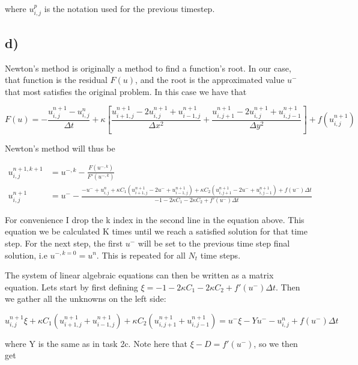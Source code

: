 \documentclass[norsk,a4paper,12pt]{scrartcl}
\begin{document}
where $u_{i, j}^p$ is the notation used for the previous timestep.

\subsection{d)}
Newton's method is originally a method to find a function's root. In our case, that function is the residual $F(u)$, and the root is the approximated value $u^-$ that most satisfies the original problem. In this case we have that 

\begin{equation}
    F(u) = -\frac{u_{i,j}^{n+1}-u_{i,j}^n}{\Delta t}+ \kappa \left[ \frac{ u_{i+1,j}^{n+1} -2u_{i,j}^{n+1} + u_{i-1,j}^{n+1}}{\Delta x^2} + \frac{ u_{i,j+1}^{n+1} -2u_{i,j}^{n+1} + u_{i,j-1}^{n+1} }{\Delta y^2} \right] + f(u_{i,j}^{n+1})
\end{equation}

Newton's method will thus be 

\begin{equation*}
\begin{aligned}
    u^{n+1, k+1}_{i,j} &= u^{-, k} - \frac{F(u^{-,k})}{F'(u^{-,k})} \\
    u^{n+1}_{i,j} &= u^- - \frac{ -u^- + u_{i,j}^n + \kappa C_1( u_{i+1,j}^{n+1} -2u^{-}+ u_{i-1,j}^{n+1} ) + \kappa C_2(u_{i,j+1}^{n+1} -2u^{-}+ u_{i,j-1}^{n+1}) + f(u^-)\Delta t }{ -1 -2\kappa C_1 - 2\kappa C_2 + f'(u^-)\Delta t }
\end{aligned}
\end{equation*}

For convenience I drop the k index in the second line in the equation above. This equation we be calculated K times until we reach a satisfied solution for that time step. For the next step, the first $u^-$ will be set to the previous time step final solution, i.e $u^{-, k=0} = u^{n}$. This is repeated for all $N_t$ time steps.\par 
The system of linear algebraic equations can then be written as a matrix equation. Lets start by first defining $\xi = -1 -2\kappa C_1 - 2\kappa C_2 + f'(u^-)\Delta t$. Then we gather all the unknowns on the left side:

\begin{equation*}
    u_{i,j}^{n+1}\xi + \kappa C_1(u_{i+1,j}^{n+1} + u_{i-1,j}^{n+1}) + \kappa C_2(u_{i,j+1}^{n+1} + u_{i,j-1}^{n+1}) = u^-\xi -Yu^- - u_{i,j}^n + f(u^-)\Delta t
\end{equation*}

where Y is the same as in task 2c. Note here that $\xi - D = f'(u^-)$, so we then get 
\end{document}
